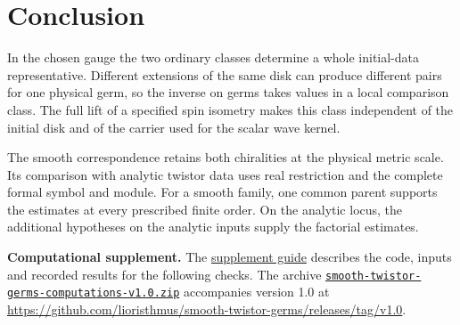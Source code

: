 \documentclass[
  english,
  11pt,
  reqno]{amsart}
\begin{document}
\section{Conclusion}\label{conclusion}\label{sec:conclusion}

In the chosen gauge the two ordinary classes determine a whole
initial-data representative. Different extensions of the same disk can
produce different pairs for one physical germ, so the inverse on germs
takes values in a local comparison class. The full lift of a specified
spin isometry makes this class independent of the initial disk and of
the carrier used for the scalar wave kernel.

The smooth correspondence retains both chiralities at the physical
metric scale. Its comparison with analytic twistor data uses real
restriction and the complete formal symbol and module. For a smooth
family, one common parent supports the estimates at every prescribed
finite order. On the analytic locus, the additional hypotheses on the
analytic inputs supply the factorial estimates.

\textbf{Computational supplement.} The \href{../computations/README.md}{supplement guide} describes the code, inputs and recorded results for the following checks. The archive \href{https://github.com/lioristhmus/smooth-twistor-germs/releases/download/v1.0/smooth-twistor-germs-computations-v1.0.zip}{\nolinkurl{smooth-twistor-germs-computations-v1.0.zip}} accompanies version 1.0 at \url{https://github.com/lioristhmus/smooth-twistor-germs/releases/tag/v1.0}.
\end{document}
